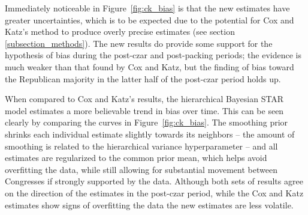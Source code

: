 Immediately noticeable in Figure~\ref{fig:ck_bias} is that the new estimates have greater uncertainties, which is to be expected due to the potential for Cox and Katz's method to produce overly precise estimates  (see section \ref{subsection_methods}). The new results do provide some support for the hypothesis of bias during the post-czar and post-packing periods; the evidence is much weaker than that found by Cox and Katz, but the finding of bias toward the Republican majority in the latter half of the post-czar period holds up. 

When compared to Cox and Katz's results, the hierarchical Bayesian STAR model estimates a more believable trend in bias over time. This can be seen clearly by comparing the curves in Figure~\ref{fig:ck_bias}. The smoothing prior shrinks each individual estimate slightly towards its neighbors -- the amount of smoothing is related to the hierarchical variance hyperparameter -- and all estimates are regularized to the common prior mean, which helps avoid overfitting the data, while still allowing for substantial movement between Congresses if strongly supported by the data. Although both sets of results agree on the direction of the estimates in the post-czar period, while the Cox and Katz estimates show signs of overfitting the data the new estimates are less volatile. 

